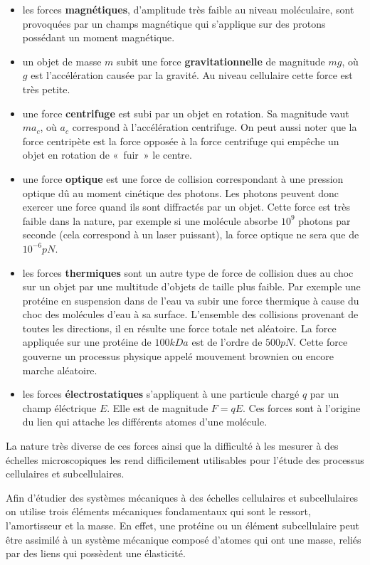 \documentclass[12pt,a4paper,twoside,openright]{book}
\begin{document}
\begin{itemize}
\item
  les forces \textbf{magnétiques}, d'amplitude très faible au niveau
  moléculaire, sont provoquées par un champs magnétique qui s'applique
  sur des protons possédant un moment magnétique.
\item
  un objet de masse \(m\) subit une force \textbf{gravitationnelle} de
  magnitude \(mg\), où \(g\) est l'accélération causée par la gravité.
  Au niveau cellulaire cette force est très petite.
\item
  une force \textbf{centrifuge} est subi par un objet en rotation. Sa
  magnitude vaut \(ma_c\), où \(a_c\) correspond à l'accélération
  centrifuge. On peut aussi noter que la force centripète est la force
  opposée à la force centrifuge qui empêche un objet en rotation de
  «~fuir~» le centre.
\item
  une force \textbf{optique} est une force de collision correspondant à
  une pression optique dû au moment cinétique des photons. Les photons
  peuvent donc exercer une force quand ils sont diffractés par un objet.
  Cette force est très faible dans la nature, par exemple si une
  molécule absorbe \(10^9\) photons par seconde (cela correspond à un
  laser puissant), la force optique ne sera que de \(10^{-6}pN\).
\item
  les forces \textbf{thermiques} sont un autre type de force de
  collision dues au choc sur un objet par une multitude d'objets de
  taille plus faible. Par exemple une protéine en suspension dans de
  l'eau va subir une force thermique à cause du choc des molécules d'eau
  à sa surface. L'ensemble des collisions provenant de toutes les
  directions, il en résulte une force totale net aléatoire. La force
  appliquée sur une protéine de \(100kDa\) est de l'ordre de \(500pN\).
  Cette force gouverne un processus physique appelé mouvement brownien
  ou encore marche aléatoire.
\item
  les forces \textbf{électrostatiques} s'appliquent à une particule
  chargé \(q\) par un champ éléctrique \(E\). Elle est de magnitude
  \(F = qE\). Ces forces sont à l'origine du lien qui attache les
  différents atomes d'une molécule.
\end{itemize}

La nature très diverse de ces forces ainsi que la difficulté à les
mesurer à des échelles microscopiques les rend difficilement utilisables
pour l'étude des processus cellulaires et subcellulaires.

Afin d'étudier des systèmes mécaniques à des échelles cellulaires et
subcellulaires on utilise trois éléments mécaniques fondamentaux qui
sont le ressort, l'amortisseur et la masse. En effet, une protéine ou un
élément subcellulaire peut être assimilé à un système mécanique composé
d'atomes qui ont une masse, reliés par des liens qui possèdent une
élasticité.
\end{document}
